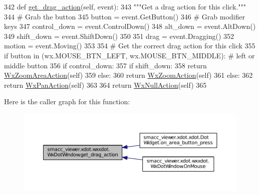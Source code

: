 \begin{DoxyCode}
342   \textcolor{keyword}{def }\hyperlink{classsmacc__viewer_1_1xdot_1_1wxxdot_1_1WxDotWindow_a19928d54bec027dc5a6257d5d0d954d6}{get\_drag\_action}(self, event):
343     \textcolor{stringliteral}{"""Get a drag action for this click."""}
344     \textcolor{comment}{# Grab the button}
345     button = event.GetButton()
346     \textcolor{comment}{# Grab modifier keys}
347     control\_down  = event.ControlDown()
348     alt\_down = event.AltDown()
349     shift\_down = event.ShiftDown()
350 
351     drag = event.Dragging()
352     motion = event.Moving()
353 
354     \textcolor{comment}{# Get the correct drag action for this click}
355     \textcolor{keywordflow}{if} button \textcolor{keywordflow}{in} (wx.MOUSE\_BTN\_LEFT, wx.MOUSE\_BTN\_MIDDLE): \textcolor{comment}{# left or middle button}
356       \textcolor{keywordflow}{if} control\_down:
357         \textcolor{keywordflow}{if} shift\_down:
358           \textcolor{keywordflow}{return} \hyperlink{classsmacc__viewer_1_1xdot_1_1wxxdot_1_1WxZoomAreaAction}{WxZoomAreaAction}(self)
359         \textcolor{keywordflow}{else}:
360           \textcolor{keywordflow}{return} \hyperlink{classsmacc__viewer_1_1xdot_1_1wxxdot_1_1WxZoomAction}{WxZoomAction}(self)
361       \textcolor{keywordflow}{else}:
362         \textcolor{keywordflow}{return} \hyperlink{classsmacc__viewer_1_1xdot_1_1wxxdot_1_1WxPanAction}{WxPanAction}(self)
363 
364     \textcolor{keywordflow}{return} \hyperlink{classsmacc__viewer_1_1xdot_1_1wxxdot_1_1WxNullAction}{WxNullAction}(self)
365 
\end{DoxyCode}


Here is the caller graph for this function\+:
\nopagebreak
\begin{figure}[H]
\begin{center}
\leavevmode
\includegraphics[width=350pt]{classsmacc__viewer_1_1xdot_1_1wxxdot_1_1WxDotWindow_a19928d54bec027dc5a6257d5d0d954d6_icgraph}
\end{center}
\end{figure}


